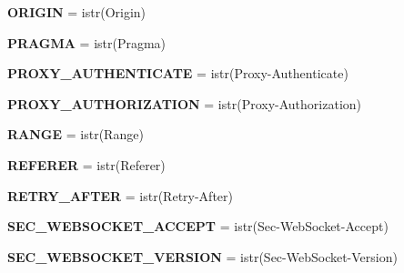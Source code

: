 \begin{DoxyCompactItemize}
\item 
\mbox{\label{namespaceaiohttp_1_1hdrs_a6acb7ab36c1bfdfd541cb9564711b210}} 
{\bfseries O\+R\+I\+G\+IN} = istr(\textquotesingle{}Origin\textquotesingle{})
\item 
\mbox{\label{namespaceaiohttp_1_1hdrs_a9614d92e54bd92f71acb39502e6ed56c}} 
{\bfseries P\+R\+A\+G\+MA} = istr(\textquotesingle{}Pragma\textquotesingle{})
\item 
\mbox{\label{namespaceaiohttp_1_1hdrs_aabe8f09c2721c824e10a80d76247d3f7}} 
{\bfseries P\+R\+O\+X\+Y\+\_\+\+A\+U\+T\+H\+E\+N\+T\+I\+C\+A\+TE} = istr(\textquotesingle{}Proxy-\/Authenticate\textquotesingle{})
\item 
\mbox{\label{namespaceaiohttp_1_1hdrs_ab7d63527eb74c06a86ad3355740014b9}} 
{\bfseries P\+R\+O\+X\+Y\+\_\+\+A\+U\+T\+H\+O\+R\+I\+Z\+A\+T\+I\+ON} = istr(\textquotesingle{}Proxy-\/Authorization\textquotesingle{})
\item 
\mbox{\label{namespaceaiohttp_1_1hdrs_a1b7bcc5dfa6298ff8af49db4143b4e6a}} 
{\bfseries R\+A\+N\+GE} = istr(\textquotesingle{}Range\textquotesingle{})
\item 
\mbox{\label{namespaceaiohttp_1_1hdrs_af02286c4da56af07673cf0697bbf8507}} 
{\bfseries R\+E\+F\+E\+R\+ER} = istr(\textquotesingle{}Referer\textquotesingle{})
\item 
\mbox{\label{namespaceaiohttp_1_1hdrs_a3be3b8e68e15ac50c7b333b06a92d260}} 
{\bfseries R\+E\+T\+R\+Y\+\_\+\+A\+F\+T\+ER} = istr(\textquotesingle{}Retry-\/After\textquotesingle{})
\item 
\mbox{\label{namespaceaiohttp_1_1hdrs_ac201b825bf3671de4b5f51c4aeaed0c3}} 
{\bfseries S\+E\+C\+\_\+\+W\+E\+B\+S\+O\+C\+K\+E\+T\+\_\+\+A\+C\+C\+E\+PT} = istr(\textquotesingle{}Sec-\/Web\+Socket-\/Accept\textquotesingle{})
\item 
\mbox{\label{namespaceaiohttp_1_1hdrs_a7dd7fcc39deb89ae909feb4245422271}} 
{\bfseries S\+E\+C\+\_\+\+W\+E\+B\+S\+O\+C\+K\+E\+T\+\_\+\+V\+E\+R\+S\+I\+ON} = istr(\textquotesingle{}Sec-\/Web\+Socket-\/Version\textquotesingle{})

\end{DoxyCompactItemize}
